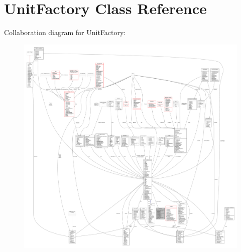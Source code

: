 \hypertarget{classUnitFactory}{}\section{Unit\+Factory Class Reference}
\label{classUnitFactory}


Collaboration diagram for Unit\+Factory\+:
\nopagebreak
\begin{figure}[H]
\begin{center}
\leavevmode
\includegraphics[width=350pt]{d2/d6e/classUnitFactory__coll__graph}
\end{center}
\end{figure}
